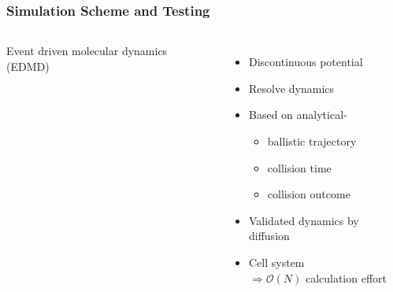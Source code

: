 \documentclass[smaller,notes=hide]{beamer}
\newlength{\wideitemsep}
\let\olditem\item
\renewcommand{\item}{\setlength{\itemsep}{\wideitemsep}\olditem}
\begin{document}
\begin{frame}
\frametitle{Simulation Scheme and Testing}
\begin{columns} 

Event driven molecular dynamics (EDMD)
\begin{itemize}
\item Discontinuous potential
\item Resolve dynamics
\item Based on analytical-
\begin{itemize}
\item ballistic trajectory
\item collision time
\item collision outcome
\end{itemize}
\vspace{0.25cm}
\item<2-> Validated dynamics by diffusion
\item<3> Cell system \\
\quad $\Rightarrow \mathcal{O}(N)$ calculation effort
\end{itemize}





\end{columns}
\end{frame}
\end{document}
